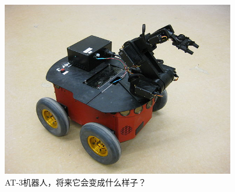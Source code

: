 \begin{figure}[h]
        \begin{center}
                \includegraphics[keepaspectratio, width=4in]{Figures/ch4.our.jpg}
        \caption{AT-3机器人，将来它会变成什么样子？}
        \end{center}
        \label{fig:Design_Development_Flowchart}
\end{figure}





